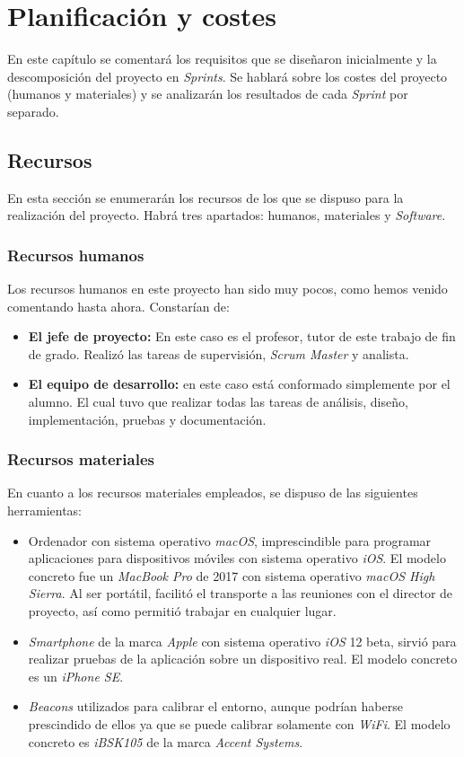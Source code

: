 \chapter{Planificación y costes} \label{planificacion_chap}
En este capítulo se comentará los requisitos que se diseñaron inicialmente y la descomposición del proyecto en \textit{Sprints}. Se hablará sobre los costes del proyecto (humanos y materiales) y se analizarán los resultados de cada \textit{Sprint} por separado. 
\section{Recursos}
En esta sección se enumerarán los recursos de los que se dispuso para la realización del proyecto. Habrá tres apartados: humanos, materiales y \textit{Software}.
\subsection*{Recursos humanos}
Los recursos humanos en este proyecto han sido muy pocos, como hemos venido comentando hasta ahora. Constarían de:
\begin{itemize}
\item \textbf{El jefe de proyecto:} En este caso es el profesor, tutor de este trabajo de fin de grado. Realizó las tareas de supervisión, \textit{Scrum Master} y analista.
\item \textbf{El equipo de desarrollo:} en este caso está conformado simplemente por el alumno. El cual tuvo que realizar todas las tareas de análisis, diseño, implementación, pruebas y documentación.
\end{itemize}
\subsection*{Recursos materiales}
En cuanto a los recursos materiales empleados, se dispuso de las siguientes herramientas:
\begin{itemize}
\item Ordenador con sistema operativo \textit{macOS}, imprescindible para programar aplicaciones para dispositivos móviles con sistema operativo \textit{iOS}. El modelo concreto fue un \textit{MacBook Pro} de 2017 con sistema operativo \textit{macOS High Sierra}. Al ser portátil, facilitó el transporte a las reuniones con el director de proyecto, así como permitió trabajar en cualquier lugar.
\item \textit{Smartphone} de la marca \textit{Apple} con sistema operativo \textit{iOS} 12 beta, sirvió para realizar pruebas de la aplicación sobre un dispositivo real. El modelo concreto es un \textit{iPhone SE}.
\item \textit{Beacons} utilizados para calibrar el entorno, aunque podrían haberse prescindido de ellos ya que se puede calibrar solamente con \textit{WiFi}. El modelo concreto es \textit{iBSK105} de la marca \textit{Accent Systems}.
\end{itemize}
